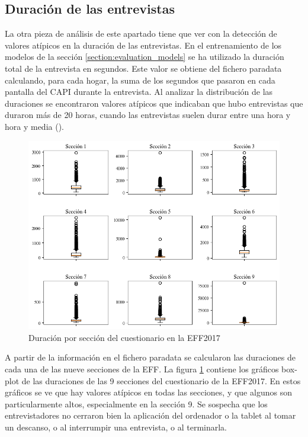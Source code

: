 \subsection*{Duración de las entrevistas}

La otra pieza de análisis de este apartado tiene que ver con la detección de valores atípicos en la duración de las entrevistas. En el entrenamiento de los modelos de la sección \ref{section:evaluation_models} se ha utilizado la duración total de la entrevista en segundos. Este valor se obtiene del fichero paradata calculando, para cada hogar, la suma de los segundos que pasaron en cada pantalla del CAPI durante la entrevista. Al analizar la distribución de las duraciones se encontraron valores atípicos que indicaban que hubo entrevistas que duraron más de 20 horas, cuando las entrevistas suelen durar entre una hora y hora y media (\cite{effmethod2017}).

\begin{figure}[ht]
	\centering
	\includegraphics[width=1\textwidth]{figs/figure4.png}
	\caption{Duración por sección del cuestionario en la EFF2017}
	\label{fig:fig4}
\end{figure}

A partir de la información en el fichero paradata se calcularon las duraciones de cada una de las nueve secciones de la EFF. La figura \ref{fig:fig4} contiene los gráficos box-plot de las duraciones de las 9 secciones del cuestionario de la EFF2017. En estos gráficos se ve que hay valores atípicos en todas las secciones, y que algunos son particularmente altos, especialmente en la sección 9. Se sospecha que los entrevistadores no cerraron bien la aplicación del ordenador o la tablet al tomar un descanso, o al interrumpir una entrevista, o al terminarla.

